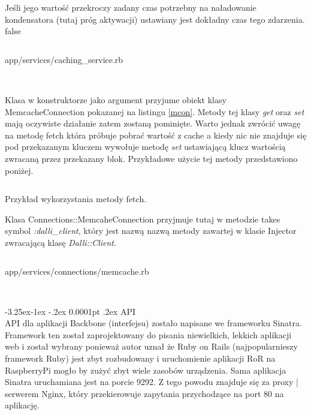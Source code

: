 \documentclass[11pt,a4paper, twoside]{article}
\makeatletter
\renewcommand\paragraph{\@startsection{paragraph}{4}{\z@}%
                                     {-3.25ex\@plus -1ex \@minus -.2ex}%
                                     {0.0001pt \@plus .2ex}%
                                     {\normalfont\normalsize\bfseries}}
\makeatother
\begin{document}
Jeśli jego wartość przekroczy zadany czas potrzebny na naładowanie kondensatora (tutaj próg aktywacji) ustawiany jest dokładny czas tego zdarzenia. %
\if false
\newpage
\begin{listing}[H]
\inputminted[linenos=true]{ruby}{./src/cachingservice.rb}
\caption{app/services/caching\_service.rb}
$\label{caching}$
\end{listing}
\noindent
Klasa w konstruktorze jako argument przyjume obiekt klasy \mbox{MemcacheConnection} pokazanej na listingu \ref{mcon}. Metody tej klasy \emph{get} oraz \emph{set} mają oczywiste działanie zatem zostaną pominięte. Warto jednak zwrócić uwagę na metodę fetch która próbuje pobrać wartość z cache a kiedy nic nie znajduje się pod przekazanym kluczem wywołuje metodę \emph{set} ustawiającą klucz wartością zwracaną przez przekazany blok. Przykładowe użycie tej metody przedstawiono poniżej.
\begin{listing}
\inputminted[linenos=true]{ruby}{./src/fetch.rb}
\caption{Przykład wykorzystania metody fetch.}
\end{listing}
\newpage
\noindent
Klasa Connections::MemcaheConnection przyjmuje tutaj w metodzie takes symbol \emph{:dalli\_client}, który jest nazwą nazwą metody zawartej w klasie Injector zwracającą klasę \emph{Dalli::Client}.
\begin{listing}
\inputminted[linenos=true]{ruby}{./src/memcache.rb}
\caption{app/services/connections/memcache.rb}
$\label{mcon}$
\end{listing}
\fi
\newpage
\paragraph{API} ~\\
\indent API dla aplikacji Backbone (interfejsu) zostało napisane we frameworku Sinatra. Framework ten został  zaprojektowany do pisania niewielkich, lekkich aplikacji web i został wybrany ponieważ autor uznał że Ruby on Rails (najpopularnieszy framework Ruby) jest zbyt rozbudowany i uruchomienie aplikacji RoR na RaspberryPi mogło by zużyć zbyt wiele zasobów urządzenia. Sama aplikacja Sinatra uruchamiana jest na porcie 9292. Z tego powodu znajduje się za proxy | serwerem Nginx, który przekierowuje zapytania przychodzące na port 80 na aplikację.
\end{document}
